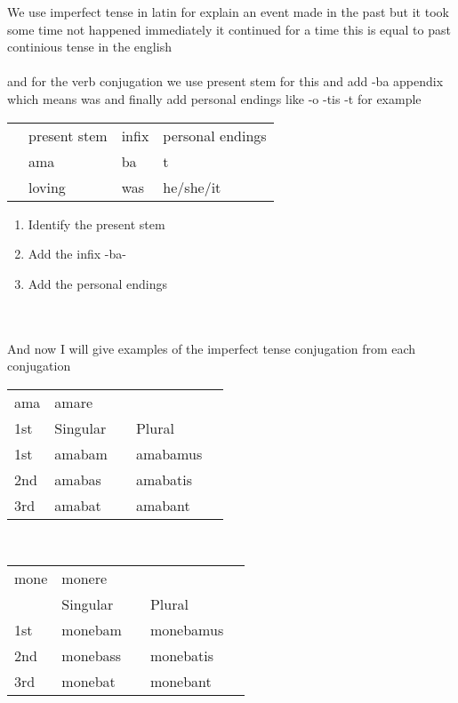 We use imperfect tense in latin for explain an event made in the past but it took some
time not happened immediately it continued for a time this is equal to past continious tense
in the english \\\\
and for the verb conjugation we use present stem for this and add -ba appendix which means was and finally add personal
endings like -o -tis -t for example 
\begin{center}
  \begin{tabular}{llll}
    &present stem & infix & personal endings& \\
    &ama& ba & t& \\
    &loving &was &he/she/it&
  \end{tabular}
\end{center}
\begin{enumerate}[I]
  \item Identify the present stem  
  \item Add the infix -ba- 
  \item Add the personal endings 
\end{enumerate} \\\\
And now I will give examples of the imperfect tense conjugation from each conjugation
\begin{center}  
  \begin{tabular}{lllll}
      ama & amare & & & \\
      1st  & Singular  &   & Plural & \\
      1st & amabam  &  & amabamus &  \\
      2nd & amabas &  & amabatis &  \\
      3rd & amabat &  & amabant  &  \\
  \end{tabular}
\end{center} \\

\begin{center}  
  \begin{tabular}{lllll}
    mone & monere & & & \\
      & Singular  &   & Plural & \\
      1st & monebam  &  & monebamus &  \\
      2nd & monebass &  & monebatis &  \\
      3rd & monebat &  & monebant  &  \\
  \end{tabular}
\end{center}

